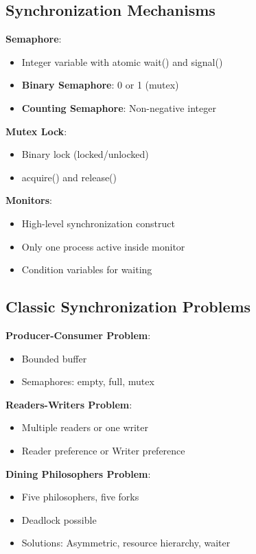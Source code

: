 \documentclass[12pt,a4paper]{report}
\begin{document}
\subsection{Synchronization Mechanisms}
\begin{concept}
\textbf{Semaphore}:
\begin{itemize}
    \item Integer variable with atomic wait() and signal()
    \item \textbf{Binary Semaphore}: 0 or 1 (mutex)
    \item \textbf{Counting Semaphore}: Non-negative integer
\end{itemize}

\textbf{Mutex Lock}:
\begin{itemize}
    \item Binary lock (locked/unlocked)
    \item acquire() and release()
\end{itemize}

\textbf{Monitors}:
\begin{itemize}
    \item High-level synchronization construct
    \item Only one process active inside monitor
    \item Condition variables for waiting
\end{itemize}
\end{concept}

\subsection{Classic Synchronization Problems}
\begin{concept}
\textbf{Producer-Consumer Problem}:
\begin{itemize}
    \item Bounded buffer
    \item Semaphores: empty, full, mutex
\end{itemize}

\textbf{Readers-Writers Problem}:
\begin{itemize}
    \item Multiple readers or one writer
    \item Reader preference or Writer preference
\end{itemize}

\textbf{Dining Philosophers Problem}:
\begin{itemize}
    \item Five philosophers, five forks
    \item Deadlock possible
    \item Solutions: Asymmetric, resource hierarchy, waiter
\end{itemize}
\end{concept}
\end{document}
